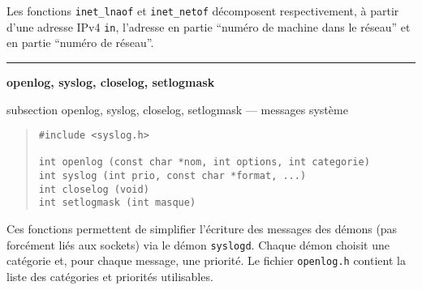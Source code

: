 \documentclass [twoside] {report}
\newcommand {\primitive} [1]
    {
	\phantomsection
	{\large \bf #1}
	\addcontentsline {toc} {subsection} {#1}
    }
\newcommand {\separation}
    {
	\vspace {5mm}
	\nopagebreak
	\hrule
    }
\begin{document}
Les fonctions {\tt inet\_lnaof} et {\tt inet\_netof} décomposent
respectivement, à partir d'une adresse IPv4 {\tt in}, l'adresse en partie
``numéro de machine dans le réseau'' et en partie ``numéro de réseau''.



\separation
\primitive {openlog, syslog, closelog, setlogmask} --- messages système

\begin {quote}
\begin {verbatim}
#include <syslog.h>

int openlog (const char *nom, int options, int categorie)
int syslog (int prio, const char *format, ...)
int closelog (void)
int setlogmask (int masque)
\end{verbatim}
\end {quote}

Ces fonctions permettent de simplifier l'écriture des messages des
démons (pas forcément liés aux sockets) via le démon {\tt syslogd}.
Chaque démon choisit une catégorie et, pour chaque message, une
priorité. Le fichier {\tt openlog.h} contient la liste des catégories et
priorités utilisables.
\end{document}

